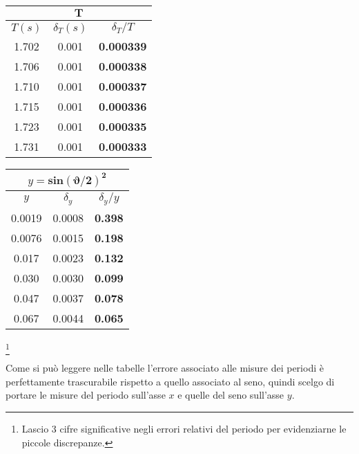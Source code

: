 \documentclass{article}
\begin{document}
	\begin{minipage}{0.5\textwidth}
		\begin{table}[H]
			\centering
			\begin{tabular}{@{}ccc@{}}
				\multicolumn{3}{c}{$\mathbf{T}$} \\ \midrule
				$T(s)$ & $\delta_T (s)$ & $\delta_T / T$ \\ \midrule
				1.702 & 0.001 & \textbf{0.000339} \\
				1.706 & 0.001 & \textbf{0.000338} \\
				1.710 & 0.001 & \textbf{0.000337} \\
				1.715 & 0.001 & \textbf{0.000336} \\
				1.723 & 0.001 & \textbf{0.000335} \\
				1.731 & 0.001 & \textbf{0.000333}  \\ \bottomrule   
			\end{tabular}
		\end{table}
	\end{minipage}
	\begin{minipage}{0.5\textwidth}
		\begin{table}[H]
			\centering
			\begin{tabular}{@{}ccc@{}}
				
				\multicolumn{3}{c}{$y = \mathbf{sin{\left(\vartheta/2\right)}^2}$} \\ \midrule
				$y$ & $\delta_y$ & $\delta_y / y$ \\ \midrule
				0.0019&0.0008 & \textbf{0.398} \\
				0.0076&0.0015 & \textbf{0.198}  \\
				0.017&0.0023 & \textbf{0.132}  \\ 
				0.030&0.0030 & \textbf{0.099}  \\
				0.047&0.0037 & \textbf{0.078}  \\
				0.067&0.0044 & \textbf{0.065}  \\ \bottomrule  
			\end{tabular}
		\end{table}
	\end{minipage}
	\footnote{Lascio 3 cifre significative negli errori relativi del periodo per evidenziarne le piccole discrepanze.}
	\vspace{1cm}
	
	\noindent
	Come si può leggere nelle tabelle l'errore associato alle misure dei periodi è perfettamente trascurabile rispetto a quello associato al seno, quindi scelgo di portare le misure del periodo sull'asse $x$ e quelle del seno sull'asse $y$. \\
	
\end{document}
